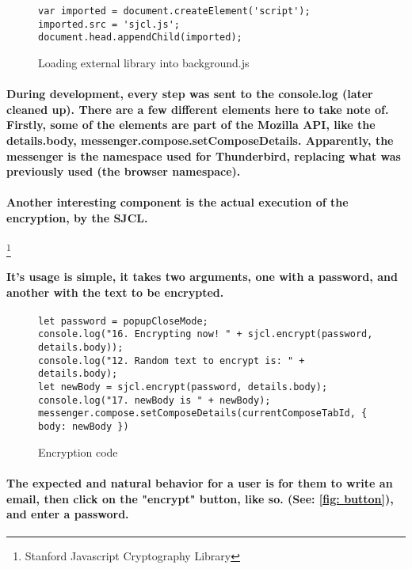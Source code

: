 \begin{figure}[H]
\centering
\begin{verbatim}
var imported = document.createElement('script');
imported.src = 'sjcl.js';
document.head.appendChild(imported);
\end{verbatim}
\caption{\label{fig: loadSJCL} Loading external library into background.js}
\end{figure}

\paragraph{During development, every step was sent to the console.log (later cleaned up). There are a few different elements here to take note of. Firstly, some of the elements are part of the Mozilla API, like the details.body, messenger.compose.setComposeDetails. Apparently, the messenger is the namespace used for Thunderbird, replacing what was previously used (the browser namespace).}

\paragraph{Another interesting component is the actual execution of the encryption, by the SJCL.}\footnote{Stanford Javascript Cryptography Library}

\paragraph{It's usage is simple, it takes two arguments, one with a password, and another with the text to be encrypted.}


\begin{figure}[H]
\centering
\begin{verbatim}
let password = popupCloseMode;
console.log("16. Encrypting now! " + sjcl.encrypt(password, details.body));
console.log("12. Random text to encrypt is: " + details.body);
let newBody = sjcl.encrypt(password, details.body);
console.log("17. newBody is " + newBody);
messenger.compose.setComposeDetails(currentComposeTabId, { body: newBody })
\end{verbatim}
\caption{\label{fig: encryptionCode} Encryption code}
\end{figure}

\paragraph{The expected and natural behavior for a user is for them to write an email, then click on the "encrypt" button, like so. (See: \ref{fig: button}), and enter a password.}

